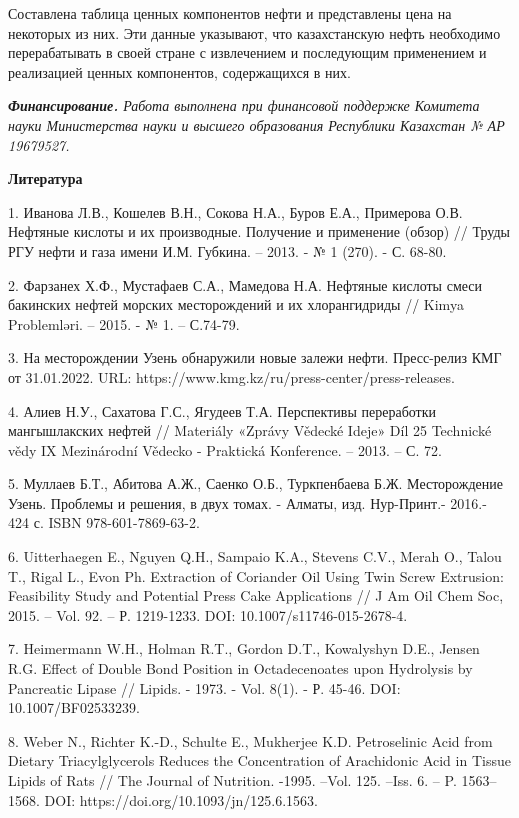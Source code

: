 Составлена таблица ценных компонентов нефти и представлены цена на
некоторых из них. Эти данные указывают, что казахстанскую нефть
необходимо перерабатывать в своей стране с извлечением и последующим
применением и реализацией ценных компонентов, содержащихся в них.

\emph{{\bfseries Финансирование.} Работа выполнена при финансовой поддержке
Комитета науки Министерства науки и высшего образования Республики
Казахстан № АР 19679527.}

{\bfseries Литература}

1. Иванова Л.В., Кошелев В.Н., Сокова Н.А., Буров Е.А., Примерова О.В.
Нефтяные кислоты и их производные. Получение и применение (обзор) //
Труды РГУ нефти и газа имени И.М. Губкина. -- 2013. - № 1 (270). - С.
68-80.

2. Фарзанех Х.Ф., Мустафаев С.А., Мамедова Н.А. Нефтяные кислоты смеси
бакинских нефтей морских месторождений и их хлорангидриды // Kimya
Problemləri. -- 2015. - № 1. -- С.74-79.

3. На месторождении Узень обнаружили новые залежи нефти. Пресс-релиз КМГ
от 31.01.2022. URL: https://www.kmg.kz/ru/press-center/press-releases.

4. Алиев Н.У., Сахатова Г.С., Ягудеев Т.А. Перспективы переработки
мангышлакских нефтей // Materiály «Zprávy Vědecké Ideje» Díl 25
Technické vědy IX Mezinárodní Vědecko - Praktická Konference. -- 2013.
-- С. 72.

5. Муллаев Б.Т., Абитова А.Ж., Саенко О.Б., Туркпенбаева Б.Ж.
Месторождение Узень. Проблемы и решения, в двух томах. - Алматы, изд.
Нур-Принт.- 2016.- 424 с. ISBN 978-601-7869-63-2.

6. Uitterhaegen E., Nguyen Q.H., Sampaio K.A., Stevens C.V., Merah O.,
Talou T., Rigal L., Evon Ph. Extraction of Coriander Oil Using Twin
Screw Extrusion: Feasibility Study and Potential Press Cake Applications
// J Am Oil Chem Soc, 2015. -- Vol. 92. -- Р. 1219-1233. DOI:
10.1007/s11746-015-2678-4.

7. Heimermann W.H., Holman R.T., Gordon D.T., Kowalyshyn D.E., Jensen
R.G. Effect of Double Bond Position in Octadecenoates upon Hydrolysis by
Pancreatic Lipase // Lipids. - 1973. - Vol. 8(1). - Р. 45-46. DOI:
10.1007/BF02533239.

8. Weber N., Richter K.-D., Schulte E., Mukherjee K.D. Petroselinic Acid
from Dietary Triacylglycerols Reduces the Concentration of Arachidonic
Acid in Tissue Lipids of Rats // The Journal of Nutrition. -1995. --Vol.
125. --Iss. 6. -- P. 1563--1568. DOI:
https://doi.org/10.1093/jn/125.6.1563.

